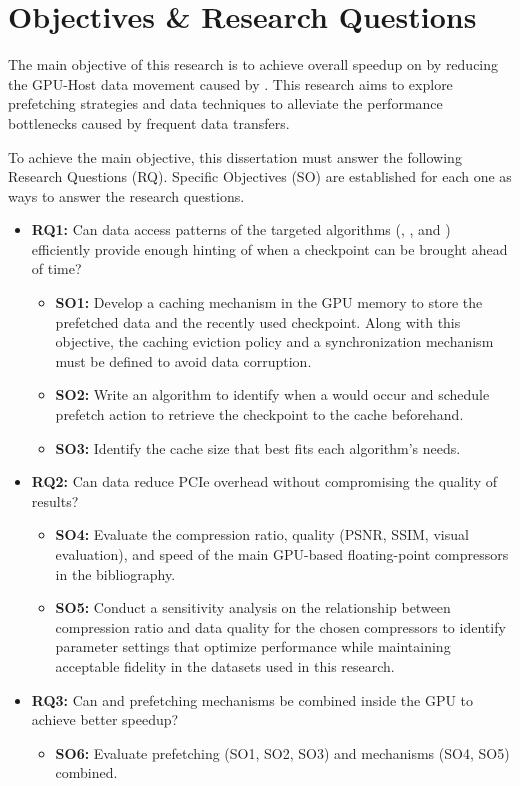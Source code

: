 \documentclass[Ingles,Final]{ic-tese-v3}
\begin{document}
\section{Objectives \& Research Questions}
The main objective of this research is to achieve overall speedup on \awave by reducing the GPU-Host data movement caused by \checkpointing. This research aims to explore prefetching strategies and data \compression techniques to alleviate the performance bottlenecks caused by frequent data transfers.

To achieve the main objective, this dissertation must answer the following Research Questions (RQ). Specific Objectives (SO) are established for each one as ways to answer the research questions.

\begin{itemize}
    \item \textbf{RQ1:} Can data access patterns of the targeted \checkpointing algorithms (\revolve, \zcut, and \uniform) efficiently provide enough hinting of when a checkpoint can be brought ahead of time?
    \begin{itemize}
        \item \textbf{SO1:} Develop a caching mechanism in the GPU memory to store the prefetched data and the recently used checkpoint. Along with this objective, the caching eviction policy and a synchronization mechanism must be defined to avoid data corruption.
        \item \textbf{SO2:} Write an algorithm to identify when a  would occur and schedule prefetch action to retrieve the checkpoint to the cache beforehand.
        \item \textbf{SO3:} Identify the cache size that best fits each \checkpointing algorithm's needs.
    \end{itemize}
    
    \item \textbf{RQ2:} Can data \compression reduce PCIe overhead without compromising the quality of results?
    \begin{itemize}
        \item \textbf{SO4:} Evaluate the compression ratio, quality (PSNR, SSIM, visual evaluation), and speed of the main GPU-based floating-point compressors in the bibliography.
        \item \textbf{SO5:} Conduct a sensitivity analysis on the relationship between compression ratio and data quality for the chosen compressors to identify parameter settings that optimize performance while maintaining acceptable fidelity in the datasets used in this research.
    \end{itemize}
    
    \item \textbf{RQ3:} Can \compression and prefetching mechanisms be combined inside the GPU to achieve better speedup?
    \begin{itemize}
        \item \textbf{SO6:} Evaluate prefetching (SO1, SO2, SO3) and \compression mechanisms (SO4, SO5) combined.
    \end{itemize}
\end{itemize}
\end{document}
